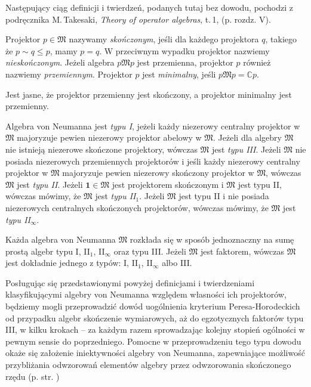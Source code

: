 Następujący ciąg definicji i twierdzeń, podanych tutaj bez dowodu,
pochodzi z podręcznika M.\,Takesaki, \emph{Theory of operator algebras}, t.\,1,
\cite{Takesaki1} (p. rozdz. V).

\begin{Definition}
    \label{def:projectionsInvN}
    Projektor $p \in \mathfrak{M}$ nazywamy \emph{skończonym}, jeśli
    dla każdego projektora $q$, takiego że $p \sim q \leq p$, mamy $p = q$.
    W przeciwnym wypadku projektor nazwiemy \emph{nieskończonym}.
    Jeżeli algebra $p \mathfrak{M} p$ jest przemienna,
    projektor $p$ również nazwiemy \emph{przemiennym}.
    Projektor $p$ jest \emph{minimalny}, jeśli $p \mathfrak{M} p = \mathbb{C} p$.
\end{Definition}

Jest jasne, że projektor przemienny jest skończony, a projektor minimalny jest przemienny.

\begin{Definition}
    \label{def:typesofvNalg}
    Algebra von Neumanna jest \emph{typu I}, jeżeli każdy niezerowy centralny
    projektor w $\mathfrak{M}$ majoryzuje pewien niezerowy projektor abelowy
    w $\mathfrak{M}$.
    Jeżeli dla algebry $\mathfrak{M}$ nie istnieją niezerowe skończone projektory,
    wówczas $\mathfrak{M}$ jest \emph{typu III}.
    Jeżeli $\mathfrak{M}$ nie posiada niezerowych przemiennych projektorów
    i jeśli każdy niezerowy centralny projektor w $\mathfrak{M}$ majoryzuje
    pewien niezerowy skończony projektor w $\mathfrak{M}$, wówczas
    $\mathfrak{M}$ jest \emph{typu II}.
    Jeżeli $\mathbf{1} \in \mathfrak{M}$ jest projektorem skończonym i
    $\mathfrak{M}$ jest typu II, wówczas mówimy, że $\mathfrak{M}$ jest \emph{typu II$_{1}$}.
    Jeżeli $\mathfrak{M}$ jest typu II i nie posiada niezerowych centralnych skończonych
    projektorów, wówczas mówimy, że $\mathfrak{M}$ jest \emph{typu II$_{\infty}$}.
\end{Definition}

\begin{Theorem}
    \label{thm:decompositionofvNalg}
    Każda algebra von Neumanna $\mathfrak{M}$ rozkłada się w sposób
    jednoznaczny na sumę prostą algebr typu I, II$_{1}$, II$_{\infty}$ oraz typu III.
    Jeżeli $\mathfrak{M}$ jest faktorem, wówczas $\mathfrak{M}$ jest dokładnie
    jednego z typów: I, II$_{1}$, II$_{\infty}$ albo III.
\end{Theorem}

Posługując się przedstawionymi powyżej definicjami i twierdzeniami klasyfikującymi
algebry von Neumanna
względem własności ich projektorów,
będziemy mogli przeprowadzić dowód uogólnienia kryterium Peresa-Horodeckich
od przypadku algebr skończenie wymiarowych,
aż do egzotycznych faktorów typu III,
w kilku krokach -- za każdym razem sprowadzając kolejny stopień ogólności
w pewnym sensie do poprzedniego.
Pomocne w przeprowadzeniu tego typu dowodu okaże się założenie iniektywności
algebry von Neumanna, zapewniające możliwość przybliżania odwzorowań
elementów algebry przez odwzorowania skończonego rzędu
(p. str. \pageref{def:injectivevNalg})

